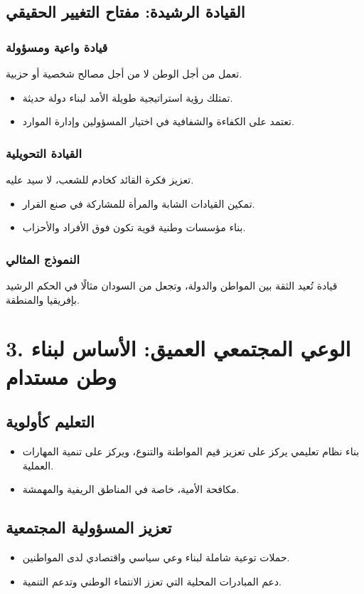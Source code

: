 \documentclass[12pt]{article}
\begin{document}
\subsection{القيادة الرشيدة: مفتاح التغيير الحقيقي}
\subsubsection{قيادة واعية ومسؤولة}
تعمل من أجل الوطن لا من أجل مصالح شخصية أو حزبية.
\begin{itemize}
    \item تمتلك رؤية استراتيجية طويلة الأمد لبناء دولة حديثة.
    \item تعتمد على الكفاءة والشفافية في اختيار المسؤولين وإدارة الموارد.
\end{itemize}

\subsubsection{القيادة التحويلية}
تعزيز فكرة القائد كخادم للشعب، لا سيد عليه.
\begin{itemize}
    \item تمكين القيادات الشابة والمرأة للمشاركة في صنع القرار.
    \item بناء مؤسسات وطنية قوية تكون فوق الأفراد والأحزاب.
\end{itemize}

\subsubsection{النموذج المثالي}
قيادة تُعيد الثقة بين المواطن والدولة، وتجعل من السودان مثالًا في الحكم الرشيد بإفريقيا والمنطقة.



\section{3. الوعي المجتمعي العميق: الأساس لبناء وطن مستدام}
\subsection{التعليم كأولوية}
\begin{itemize}
    \item بناء نظام تعليمي يركز على تعزيز قيم المواطنة والتنوع، ويركز على تنمية المهارات العملية.
    \item مكافحة الأمية، خاصة في المناطق الريفية والمهمشة.
\end{itemize}

\subsection{تعزيز المسؤولية المجتمعية}
\begin{itemize}
    \item حملات توعية شاملة لبناء وعي سياسي واقتصادي لدى المواطنين.
    \item دعم المبادرات المحلية التي تعزز الانتماء الوطني وتدعم التنمية.
\end{itemize}
\end{document}
